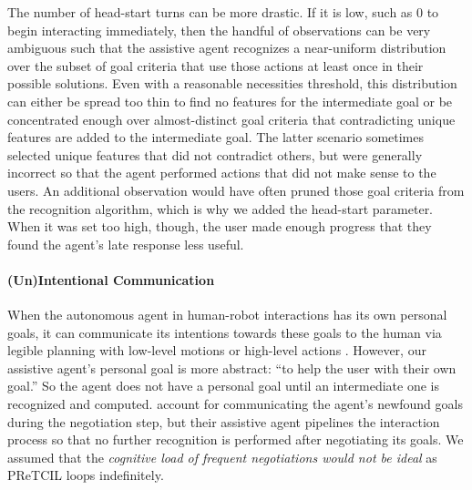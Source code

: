 \documentclass[letterpaper]{article} %
\begin{document}
The number of head-start turns can be more drastic.  If it is low, such as $0$ to begin interacting immediately, then the handful of observations can be very ambiguous such that the assistive agent recognizes a near-uniform distribution over the subset of goal criteria that use those actions at least once in their possible solutions.  Even with a reasonable necessities threshold, this distribution can either be spread too thin to find no features for the intermediate goal or be concentrated enough over almost-distinct goal criteria that contradicting unique features are added to the intermediate goal.  The latter scenario sometimes selected unique features that did not contradict others, but were generally incorrect so that the agent performed actions that did not make sense to the users.  An additional observation would have often pruned those goal criteria from the recognition algorithm, which is why we added the head-start parameter.  When it was set too high, though, the user made enough progress that they found the agent's late response less useful. %



\paragraph{(Un)Intentional Communication} When the autonomous agent in human-robot interactions has its own personal goals, it can communicate its intentions towards these goals to the human via legible planning with low-level motions \cite{Dragan-2013-7732} or high-level actions \cite{DBLP:conf/aaai/KulkarniSK19}.  However, our assistive agent's personal goal is more abstract: ``to help the user with their own goal.''  So the agent does not have a personal goal until an intermediate one is recognized and computed.  \citeauthor{geibPetrick_2016}  account for communicating the agent's newfound goals during the negotiation step, but their assistive agent pipelines the interaction process so that no further recognition is performed after negotiating its goals. %
We assumed that the \textit{cognitive load of frequent negotiations would not be ideal} as {\sc PReTCIL} loops indefinitely.
\end{document}
